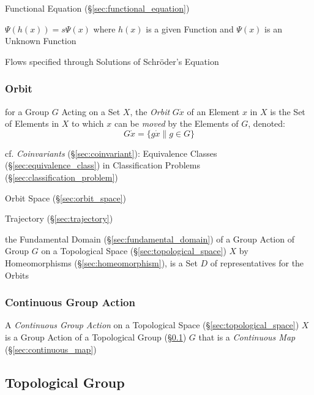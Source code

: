 Functional Equation (\S\ref{sec:functional_equation})

$\Psi(h(x)) = s\Psi(x)$ where $h(x)$ is a given Function and $\Psi(x)$ is
an Unknown Function

Flows specified through Solutions of Schr\"oder's Equation




\subsubsection{Orbit}\label{sec:orbit}

for a Group $G$ Acting on a Set $X$, the \emph{Orbit} $G \dot x$ of an Element
$x$ in $X$ is the Set of Elements in $X$ to which $x$ can be \emph{moved} by
the Elements of $G$, denoted:
\[
  G \dot x = \{ g \dot x \| g \in G \}
\]

cf. \emph{Coinvariants} (\S\ref{sec:coinvariant}): Equivalence Classes
(\S\ref{sec:equivalence_class}) in Classification Problems
(\S\ref{sec:classification_problem})

\fist Orbit Space (\S\ref{sec:orbit_space})

\fist Trajectory (\S\ref{sec:trajectory})

the Fundamental Domain (\S\ref{sec:fundamental_domain}) of a Group Action of
Group $G$ on a Topological Space (\S\ref{sec:topological_space}) $X$ by
Homeomorphisms (\S\ref{sec:homeomorphism}), is a Set $D$ of representatives for
the Orbits



\subsubsection{Continuous Group Action}\label{sec:continuous_group_action}

A \emph{Continuous Group Action} on a Topological Space
(\S\ref{sec:topological_space}) $X$ is a Group Action of a Topological Group
(\S\ref{sec:topological_group}) $G$ that is a \emph{Continuous Map}
(\S\ref{sec:continuous_map})



\subsection{Topological Group}\label{sec:topological_group}

